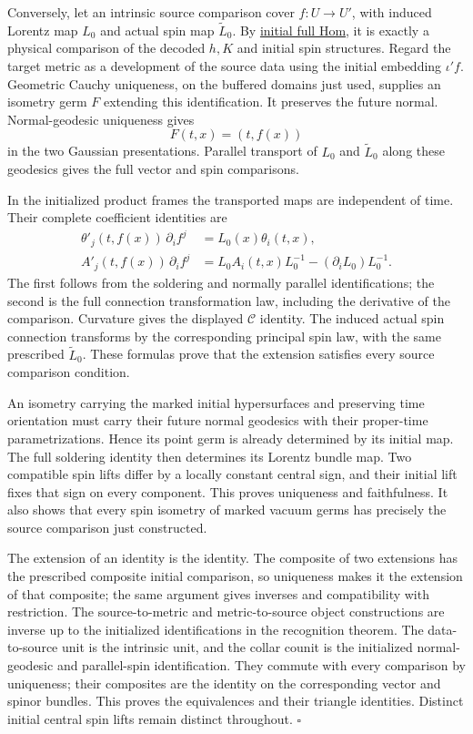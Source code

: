 \documentclass[
  english,
  11pt,
  reqno]{amsart}
\begin{document}
Conversely, let an intrinsic source comparison cover \(f:U\to U'\), with
induced Lorentz map \(L_0\) and actual spin map \(\widetilde L_0\). By
\hyperref[thm:online-initial-gradient-full-hom]{initial full Hom}, it is
exactly a physical comparison of the decoded \(h,K\) and initial spin
structures. Regard the target metric as a development of the source data
using the initial embedding \(\iota'f\). Geometric Cauchy uniqueness, on
the buffered domains just used, supplies an isometry germ \(F\)
extending this identification. It preserves the future normal.
Normal-geodesic uniqueness gives%
 \[
F(t,x)=(t,f(x))
\] in the two Gaussian presentations. Parallel transport of \(L_0\) and
\(\widetilde L_0\) along these geodesics gives the full vector and spin
comparisons.

In the initialized product frames the transported maps are independent
of time. Their complete coefficient identities are%
 \[
\begin{aligned}
\theta'_j(t,f(x))\,\partial_i f^j
&=L_0(x)\theta_i(t,x),\\
A'_j(t,f(x))\,\partial_i f^j
&=L_0A_i(t,x)L_0^{-1}
-(\partial_iL_0)L_0^{-1}.
\end{aligned}
\] The first follows from the soldering and normally parallel
identifications; the second is the full connection transformation law,
including the derivative of the comparison. Curvature gives the
displayed \(\mathcal C\) identity. The induced actual spin connection
transforms by the corresponding principal spin law, with the same
prescribed \(\widetilde L_0\). These formulas prove that the extension
satisfies every source comparison condition.

An isometry carrying the marked initial hypersurfaces and preserving
time orientation must carry their future normal geodesics with their
proper-time parametrizations. Hence its point germ is already determined
by its initial map. The full soldering identity then determines its
Lorentz bundle map. Two compatible spin lifts differ by a locally
constant central sign, and their initial lift fixes that sign on every
component. This proves uniqueness and faithfulness. It also shows that
every spin isometry of marked vacuum germs has precisely the source
comparison just constructed.

The extension of an identity is the identity. The composite of two
extensions has the prescribed composite initial comparison, so
uniqueness makes it the extension of that composite; the same argument
gives inverses and compatibility with restriction. The source-to-metric
and metric-to-source object constructions are inverse up to the
initialized identifications in the recognition theorem. The
data-to-source unit is the intrinsic unit, and the collar counit is the
initialized normal-geodesic and parallel-spin identification. They
commute with every comparison by uniqueness; their composites are the
identity on the corresponding vector and spinor bundles. This proves the
equivalences and their triangle identities. Distinct initial central
spin lifts remain distinct throughout. \hfill\(\square\)
\end{document}
